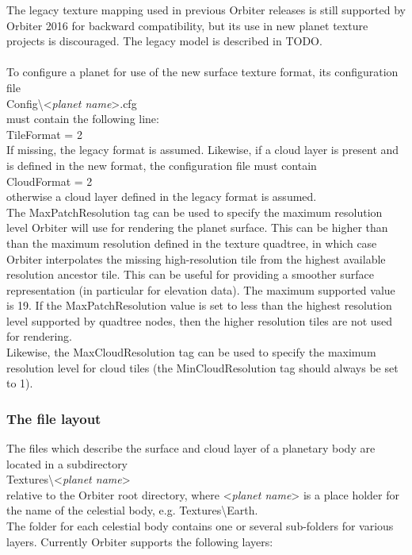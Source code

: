 \documentclass[Orbiter Developer Manual.tex]{subfiles}
\begin{document}
\noindent
The legacy texture mapping used in previous Orbiter releases is still supported by Orbiter 2016 for backward compatibility, but its use in new planet texture projects is discouraged. The legacy model is described in TODO.\\
\\
To configure a planet for use of the new surface texture format, its configuration file\\
\indent Config\textbackslash <\textit{planet name}>.cfg\\
must contain the following line:\\
\indent TileFormat = 2\\
If missing, the legacy format is assumed. Likewise, if a cloud layer is present and is defined in the new format, the configuration file must contain\\
\indent CloudFormat = 2\\
otherwise a cloud layer defined in the legacy format is assumed.\\
The MaxPatchResolution tag can be used to specify the maximum resolution level Orbiter will use for rendering the planet surface. This can be higher than than the maximum resolution defined in the texture quadtree, in which case Orbiter interpolates the missing high-resolution tile from the highest available resolution ancestor tile. This can be useful for providing a smoother surface representation (in particular for elevation data). The maximum supported value is 19. If the MaxPatchResolution value is set to less than the highest resolution level supported by quadtree nodes, then the higher resolution tiles are not used for rendering.\\
Likewise, the MaxCloudResolution tag can be used to specify the maximum resolution level for cloud tiles (the MinCloudResolution tag should always be set to 1).


\subsubsection{The file layout}
\label{sssec:tile_file_layout}
The files which describe the surface and cloud layer of a planetary body are located in a subdirectory\\
\indent Textures\textbackslash <\textit{planet name}>\\
relative to the Orbiter root directory, where <\textit{planet name}> is a place holder for the name of the celestial body, e.g. Textures\textbackslash Earth.\\
The folder for each celestial body contains one or several sub-folders for various layers. Currently Orbiter supports the following layers:
\end{document}
